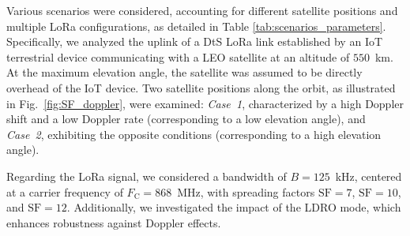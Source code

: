 \documentclass{IEEEtran}
\begin{document}
Various scenarios were considered, accounting for different satellite positions and multiple \ac{LoRa} configurations, as detailed in Table \ref{tab:scenarios_parameters}. Specifically, we analyzed the uplink of a \ac{DtS} \ac{LoRa} link established by an \ac{IoT} terrestrial device communicating with a \ac{LEO} satellite at an altitude of $550$~km. At the maximum elevation angle, the satellite was assumed to be directly overhead of the \ac{IoT} device. Two satellite positions along the orbit, as illustrated in Fig.~\ref{fig:SF_doppler}, were examined: \textit{Case~1}, characterized by a high Doppler shift and a low Doppler rate (corresponding to a low elevation angle), and \textit{Case~2}, exhibiting the opposite conditions (corresponding to a high elevation angle).
\begin{table}[t]
    \centering
    \caption{Scenarios and Parameter Settings}
    \label{tab:scenarios_parameters}
\end{table}

Regarding the \ac{LoRa} signal, we considered a bandwidth of ${B = 125}$~kHz, centered at a carrier frequency of ${F_\mathrm{C} = 868}$~MHz, with spreading factors $\mathrm{SF}=7$, $\mathrm{SF}=10$, and $\mathrm{SF}=12$. Additionally, we investigated the impact of the \ac{LDRO} mode, which enhances robustness against Doppler effects.
\end{document}
